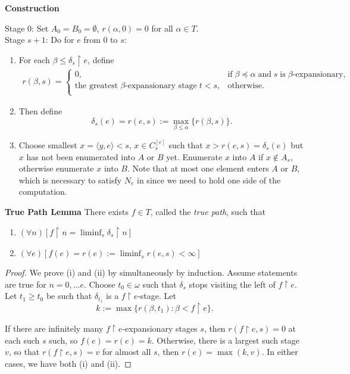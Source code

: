   \textbf{Construction}
  \begin{tcolorbox}
    Stage 0: Set $A_0=B_0=\emptyset$, $r(\alpha,0)=0$ for all $\alpha\in
    T$. \\

    Stage $s+1$: Do for $e$ from 0 to $s$:
    \begin{enumerate}
      \item For each $\beta\leq \delta_s\restriction e$, define
        \begin{align*}
          r(\beta,s) =
          \begin{cases}
            0, &\text{if}\; \beta\preceq\alpha\; \text{and}\; s\;
              \text{is}\; \beta\text{-expansionary},\\
            \text{the greatest}\; \beta\text{-expansionary stage}\; t<s,
              &\text{otherwise}.\\
          \end{cases}
        \end{align*}
      \item Then define
        \[\delta_s(e) =r(e,s) :=\max_{\beta\leq\alpha}\{r(\beta,s)\}.\]
      \item Choose smallest $x=\langle y,e\rangle<s$, $x\in C_s^{[e]}$ such
        that $x>r(e,s)=\delta_s(e)$ but $x$ has not been enumerated into
        $A$ or $B$ yet. Enumerate $x$ into $A$ if $x\not\in A_s$, otherwise
        enumerate $x$ into $B$. Note that at most one element enters $A$ or
        $B$, which is necessary to satisfy $N_e$ in since we need to hold
        one side of the computation.
    \end{enumerate}
  \end{tcolorbox}

  \begin{lemma}
    \textbf{True Path Lemma} There exists $f\in T$, called the \textit{true
    path}, such that
    \begin{enumerate}[label=(\roman*)]
      \item $(\forall n) [f\restriction n =\liminf_s \delta_s\restriction
        n]$
      \item $(\forall e) [f(e) =r(e) :=\liminf_s r(e,s) <\infty]$
    \end{enumerate}
  \end{lemma}
  \begin{proof}
    We prove (i) and (ii) by simultaneously by induction. Assume statements
    are true for $n=0,\ldots e$. Choose $t_0\in\omega$ such that $\delta_s$
    stops visiting the left of $f\restriction e$. Let $t_1\geq t_0$ be such
    that $\delta_{t_1}$ is a $f\restriction e$-stage. Let
    \[k :=\max\{r(\beta, t_1): \beta<f\restriction e\}.\]

    If there are infinitely many $f\restriction e$-expansionary stages $s$,
    then $r(f\restriction e,s)=0$ at each such $s$ such, so $f(e)=r(e)=k$.
    Otherwise, there is a largest such stage $v$, so that $r(f\restriction
    e,s)=v$ for almost all $s$, then $r(e)=\max(k,v)$. In either cases, we
    have both (i) and (ii).
  \end{proof}

